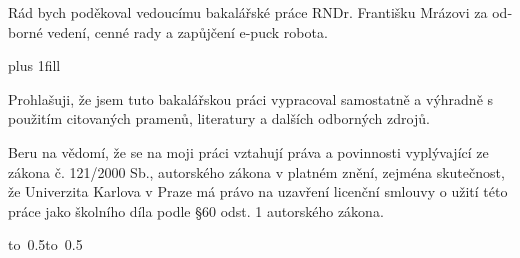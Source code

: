 \newpage



\openright

\noindent
\begin{otherlanguage}{czech}
Rád bych poděkoval vedoucímu bakalářské práce RNDr. Františku Mrázovi za
odborné vedení, cenné rady a zapůjčení e-puck robota.
\end{otherlanguage}

\newpage


\vglue 0pt plus 1fill

\noindent
Prohlašuji, že jsem tuto bakalářskou práci vypracoval samostatně a výhradně s
použitím citovaných pramenů, literatury a dalších odborných zdrojů.

\medskip\noindent
Beru na vědomí, že se na moji práci vztahují práva a povinnosti vyplývající ze
zákona č. 121/2000 Sb., autorského zákona v platném znění, zejména skutečnost,
že Univerzita Karlova v Praze má právo na uzavření licenční smlouvy o užití
této práce jako školního díla podle \S 60 odst. 1 autorského zákona.

\vspace{10mm}

\hbox{\hbox to 0.5\hbox to 0.5}

\vspace{20mm}
\newpage


